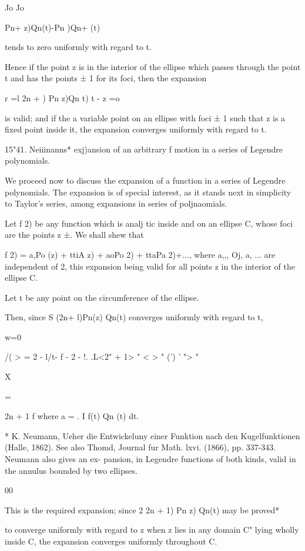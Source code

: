 {{{Jo Jo

Pn+ z)Qn(t)-Pn )Qn+ (t)

tends to zero uniformly with regard to t.

Hence if the point z is in the interior of the ellipse which passes
through the point t and has the points ± 1 for its foci, then the
expansion

r =l 2n + ) Pn z)Qn t) t - z =o

is valid; and if the a variable point on an ellipse with foci ± 1 such
that z is a fixed point inside it, the expansion converges uniformly
with regard to t.

15"41. Neiiinanns* exj)ansion of an arbitrary f motion in a series of
Legendre polynomials.

We proceed now to discuss the expansion of a function in a series of
Legendre polynomials. The expansion is of special interest, as it
stands next in simplicity to Taylor's series, among expansions in
series of poljnaomials.

Let f 2) be any function which is analj tic inside and on an ellipse
C, whose foci are the points z ±. We shall shew that

f 2) = a,Po (z) + ttiA z) + aoPo 2) + ttaPa 2)+..., where a,,, Oj, a,
... are independent of 2, this expansion being valid for all points z
in the interior of the ellipse C.

Let t be any point on the circumference of the ellipse.

Then, since S (2n+ l)Pn(z) Qn(t) converges uniformly with regard to t,

w=0

/( > = 2 - l/t- f - 2 - !. .L<2" + 1> " < > " (') ' "> "

X

= %

2n + 1 f where a = . I f(t) Qn (t) dt.

* K. Neumann, Ueher die Entwickeluny einer Funktion nach den
Kugelfunktionen (Halle, 1862). See also Thomd, Journal fur Math. lxvi.
(1866), pp. 337-343. Neumann also gives an ex- pansion, in Legendre
functions of both kinds, valid in the annulus bounded by two ellipses.

%
%

00

This is the required expansion; since 2 2n + 1) Pn z) Qn(t) may be
proved*

to converge uniformly with regard to z when z lies in any domain C"
lying wholly inside C, the expansion converges uniformly throughout C.

}}}
